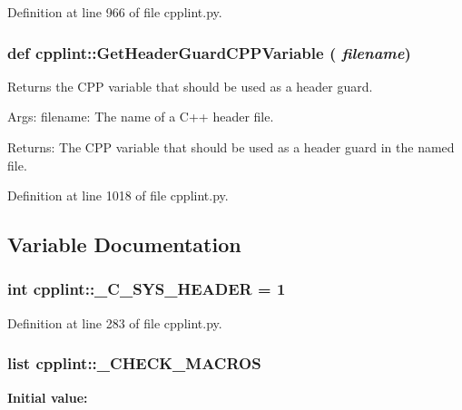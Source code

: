 Definition at line 966 of file cpplint.py.

\hypertarget{namespacecpplint_a8eedb7313093d59b41bd7c5b19c2ddaf}{
\subsubsection[{GetHeaderGuardCPPVariable}]{\setlength{\rightskip}{0pt plus 5cm}def cpplint::GetHeaderGuardCPPVariable ( {\em filename})}}
\label{namespacecpplint_a8eedb7313093d59b41bd7c5b19c2ddaf}
\begin{DoxyVerb}Returns the CPP variable that should be used as a header guard.

Args:
  filename: The name of a C++ header file.

Returns:
  The CPP variable that should be used as a header guard in the
  named file.

\end{DoxyVerb}
 

Definition at line 1018 of file cpplint.py.



\subsection{Variable Documentation}
\hypertarget{namespacecpplint_a6703b407df0f07ff6162c225070ddc9e}{
\subsubsection[{\_\-C\_\-SYS\_\-HEADER}]{\setlength{\rightskip}{0pt plus 5cm}int {\bf cpplint::\_\-C\_\-SYS\_\-HEADER} = 1}}
\label{namespacecpplint_a6703b407df0f07ff6162c225070ddc9e}


Definition at line 283 of file cpplint.py.

\hypertarget{namespacecpplint_aab5915e25e8ef5ed9d9c223a5183d6bc}{
\subsubsection[{\_\-CHECK\_\-MACROS}]{\setlength{\rightskip}{0pt plus 5cm}list {\bf cpplint::\_\-CHECK\_\-MACROS}}}
\label{namespacecpplint_aab5915e25e8ef5ed9d9c223a5183d6bc}
{\bfseries Initial value:}
\begin{DoxyCode}
\end{DoxyCode}


